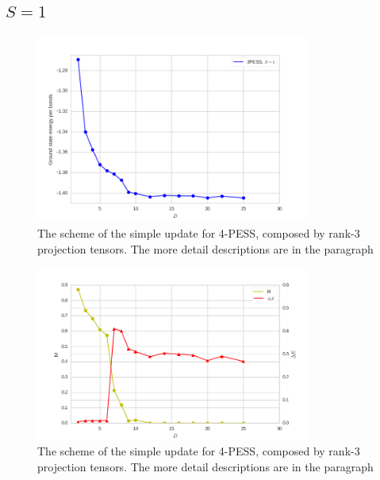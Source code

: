 \subsection{$S=1$}

\begin{figure}[ht]
	\centering
	\includegraphics[width=0.80\textwidth]{figures/3pess_S1GE.png}
	\caption[The scheme of the simple update for 4-PESS, composed by rank-3 projection tensors.]{The scheme of the simple update for 4-PESS, composed by rank-3 projection tensors. The more detail descriptions are in the paragraph}
	\label{fig4327}
\end{figure}

\begin{figure}[ht]
	\centering
	\includegraphics[width=0.80\textwidth]{figures/3pess_MDE.png}
	\caption[The scheme of the simple update for 4-PESS, composed by rank-3 projection tensors.]{The scheme of the simple update for 4-PESS, composed by rank-3 projection tensors. The more detail descriptions are in the paragraph}
	\label{fig4328}
\end{figure}

